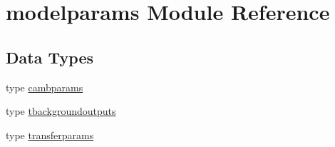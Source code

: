 \hypertarget{namespacemodelparams}{}\section{modelparams Module Reference}
\label{namespacemodelparams}
\subsection*{Data Types}
\begin{DoxyCompactItemize}
\item 
type \mbox{\hyperlink{structmodelparams_1_1cambparams}{cambparams}}
\item 
type \mbox{\hyperlink{structmodelparams_1_1tbackgroundoutputs}{tbackgroundoutputs}}
\item 
type \mbox{\hyperlink{structmodelparams_1_1transferparams}{transferparams}}
\end{DoxyCompactItemize}
